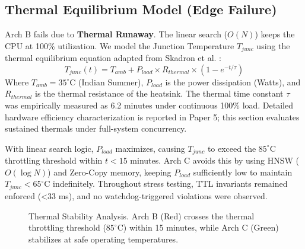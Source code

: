 \documentclass[conference]{IEEEtran}
\begin{document}
\subsection{Thermal Equilibrium Model (Edge Failure)}
Arch B fails due to \textbf{Thermal Runaway}. The linear search ($O(N)$) keeps the CPU at 100\% utilization. We model the Junction Temperature $T_{junc}$ using the thermal equilibrium equation adapted from Skadron et al. \cite{b7}:
\begin{equation}
T_{junc}(t) = T_{amb} + P_{load} \times R_{thermal} \times (1 - e^{-t/\tau})
\end{equation}
Where $T_{amb}=35^\circ$C (Indian Summer), $P_{load}$ is the power dissipation (Watts), and $R_{thermal}$ is the thermal resistance of the heatsink. The thermal time constant $\tau$ was empirically measured as 6.2 minutes under continuous 100\% load. Detailed hardware efficiency characterization is reported in Paper 5; this section evaluates sustained thermals under full-system concurrency.

With linear search logic, $P_{load}$ maximizes, causing $T_{junc}$ to exceed the $85^\circ$C throttling threshold within $t < 15$ minutes. Arch C avoids this by using HNSW ($O(\log N)$) and Zero-Copy memory, keeping $P_{load}$ sufficiently low to maintain $T_{junc} < 65^\circ$C indefinitely. Throughout stress testing, TTL invariants remained enforced (<33 ms), and no watchdog-triggered violations were observed.

\begin{figure}[htbp]
\centering
{}
\caption{Thermal Stability Analysis. Arch B (Red) crosses the thermal throttling threshold ($85^\circ$C) within 15 minutes, while Arch C (Green) stabilizes at safe operating temperatures.}
\label{fig:thermal}
\end{figure}
\end{document}
